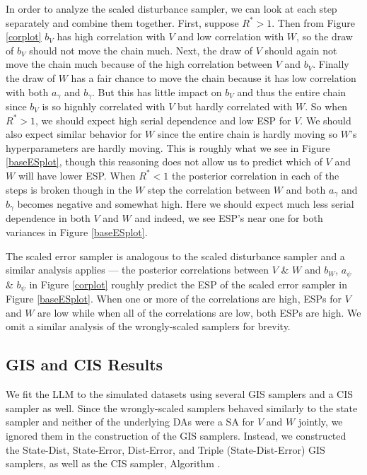 \documentclass{article}
\begin{document}
In order to analyze the scaled disturbance sampler, we can look at each step separately and combine them together. First, suppose $R^*>1$. Then from Figure \ref{corplot} $b_V$ has high correlation with $V$ and low correlation with $W$, so the draw of $b_V$ should not move the chain much. Next, the draw of $V$ should again not move the chain much because of the high correlation between $V$ and $b_V$. Finally the draw of $W$ has a fair chance to move the chain because it has low correlation with both $a_\gamma$ and $b_\gamma$. But this has little impact on $b_V$ and thus the entire chain since $b_V$ is so hignhly correlated with $V$ but hardly correlated with $W$. So when $R^*>1$, we should expect high serial dependence and low ESP for $V$. We should also expect similar behavior for $W$ since the entire chain is hardly moving so $W$'s hyperparameters are hardly moving. This is roughly what we see in Figure \ref{baseESplot}, though this reasoning does not allow us to predict which of $V$ and $W$ will have lower ESP. When $R^*<1$ the posterior correlation in each of the steps is broken though in the $W$ step the correlation between $W$ and both $a_\gamma$ and $b_\gamma$ becomes negative and somewhat high. Here we should expect much less serial dependence in both $V$ and $W$ and indeed, we see ESP's near one for both variances in Figure \ref{baseESplot}.

The scaled error sampler is analogous to the scaled disturbance sampler and a similar analysis applies --- the posterior correlations between $V$ \& $W$ and $b_W$, $a_\psi$ \& $b_\psi$ in Figure \ref{corplot} roughly predict the ESP of the scaled error sampler in Figure \ref{baseESplot}. When one or more of the correlations are high, ESPs for $V$ and $W$ are low while when all of the correlations are low, both ESPs are high. We omit a similar analysis of the wrongly-scaled samplers for brevity.

\subsection{GIS and CIS Results}

We fit the LLM to the simulated datasets using several GIS samplers and a CIS sampler as well. Since the wrongly-scaled samplers behaved similarly to the state sampler and neither of the underlying DAs were a SA for $V$ and $W$ jointly, we ignored them in the construction of the GIS samplers. Instead, we constructed the State-Dist, State-Error, Dist-Error, and Triple (State-Dist-Error) GIS samplers, as well as the CIS sampler, Algorithm . 
\end{document}
